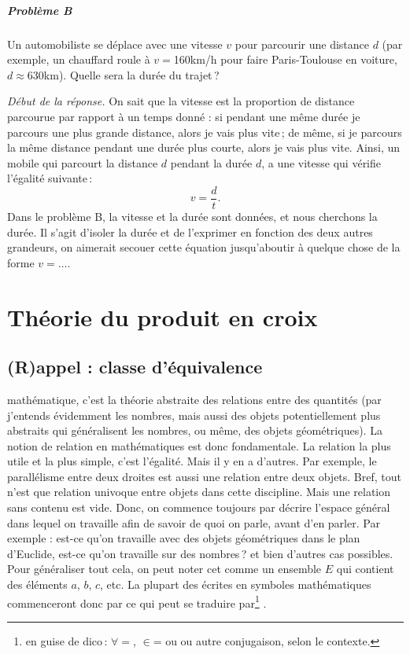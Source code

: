 	\paragraph{Problème B} Un automobiliste se déplace avec une vitesse $v$ pour parcourir une distance $d$ (par exemple, un chauffard roule à $v=$160km/h pour faire Paris-Toulouse en voiture, $d\approx 630$km). Quelle sera la durée du trajet\,?

	\emph{Début de la réponse.}
	On sait que la vitesse est la proportion de distance parcourue par rapport à un temps donné : si pendant une même durée je parcours une plus grande distance, alors je vais plus vite\,; de même, si je parcours la même distance pendant une durée plus courte, alors je vais plus vite. Ainsi, un mobile qui parcourt la distance $d$ pendant la durée $d$, a une vitesse qui vérifie l'égalité suivante\,:
	\begin{equation}
		v=\frac{d}{t}.
	\end{equation}
	Dans le problème B, la vitesse et la durée sont données, et nous cherchons la durée. Il s'agit d'isoler la durée et de l'exprimer en fonction des deux autres grandeurs, on aimerait secouer cette équation jusqu'aboutir à quelque chose de la forme \og{}$v=\ldots$\fg. 

\chapter{Théorie du produit en croix}\label{chap_croix}
	\section{(R)appel : classe d'équivalence}
		 mathématique, c'est la théorie abstraite des relations entre des quantités (par  j'entends évidemment les nombres, mais aussi des objets potentiellement plus abstraits qui généralisent les nombres, ou même, des objets géométriques). La notion de relation en mathématiques est donc fondamentale. La relation la plus utile et la plus simple, c'est l'égalité. Mais il y en a d'autres. Par exemple, le parallélisme entre deux droites est aussi une relation entre deux objets. Bref, tout n'est que relation univoque entre objets dans cette discipline. Mais une relation sans contenu est vide. Donc, on commence toujours par décrire l'espace général dans lequel on travaille afin de savoir de quoi on parle, avant d'en parler. Par exemple : est-ce qu'on travaille avec des objets géométriques dans le plan d'Euclide, est-ce qu'on travaille sur des nombres\,? et bien d'autres cas possibles. Pour généraliser tout cela, on peut noter cet  comme un ensemble $E$ qui contient des éléments $a$, $b$, $c$, etc. La plupart des  écrites en symboles mathématiques commenceront donc par  ce qui peut se traduire par\footnote{en guise de dico\,: $\forall=$, $\in$= ou  ou autre conjugaison, selon le contexte.} .

